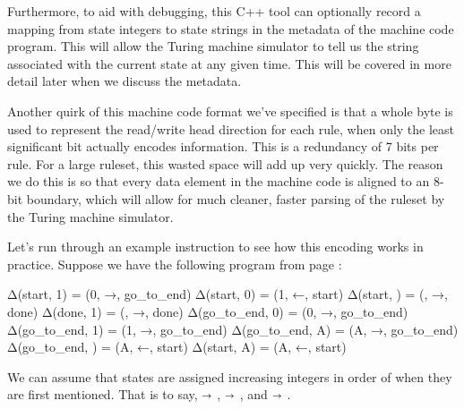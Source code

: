 Furthermore, to aid with debugging, this C++ tool can optionally record a mapping from state integers to state strings in the metadata of the machine code program. This will allow the Turing machine simulator to tell us the string associated with the current state at any given time. This will be covered in more detail later when we discuss the metadata.

Another quirk of this machine code format we've specified is that a whole byte is used to represent the read/write head direction for each rule, when only the least significant bit actually encodes information. This is a redundancy of 7 bits per rule. For a large ruleset, this wasted space will add up very quickly. The reason we do this is so that every data element in the machine code is aligned to an 8-bit boundary, which will allow for much cleaner, faster parsing of the ruleset by the Turing machine simulator.

Let's run through an example instruction to see how this encoding works in practice. Suppose we have the following program from page \pageref{program:binaryStringOfAs}:\label{program:simpleTest}
\begin{stdout}
Δ(start, 1) = (0, →, go_to_end)
Δ(start, 0) = (1, ←, start)
Δ(start, ) = (, →, done)
Δ(done, 1) = (, →, done)
Δ(go_to_end, 0) = (0, →, go_to_end)
Δ(go_to_end, 1) = (1, →, go_to_end)
Δ(go_to_end, A) = (A, →, go_to_end)
Δ(go_to_end, ) = (A, ←, start)
Δ(start, A) = (A, ←, start)
\end{stdout}
We can assume that states are assigned increasing integers in order of when they are first mentioned. That is to say,  $\shortrightarrow$ ,  $\shortrightarrow$ , and  $\shortrightarrow$ .

